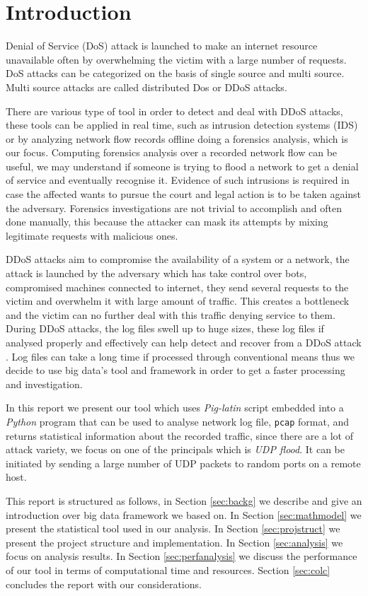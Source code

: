 \section{Introduction}
\label{sec:intro}
Denial of Service (DoS) attack is launched to make an internet resource unavailable often by overwhelming the victim with a large number of requests. DoS attacks can be categorized on the basis of single source and multi source. Multi source attacks are called distributed Dos or DDoS attacks\cite{ddos_forensics}.
 
There are various type of tool in order to detect and deal with DDoS attacks, these tools can be applied in real time, such as intrusion detection systems (IDS) or by analyzing network flow records offline doing a forensics analysis, which is our focus.
Computing forensics analysis over a recorded network flow can be useful, we may understand if someone is trying to flood a network to get a denial of service and eventually recognise it.
Evidence of such intrusions is required in case the affected wants to pursue the court and legal action is to be taken against the adversary.
Forensics investigations are not trivial to accomplish and often done manually, this because the attacker can mask its attempts by mixing legitimate requests with malicious ones.

DDoS attacks aim to compromise the availability of a system or a network, the attack is launched by the adversary which has take control over bots, compromised machines connected to internet, they send several requests to the victim and overwhelm it with large amount of traffic. This creates a bottleneck and the victim can no further deal with this traffic denying service to them.
During DDoS attacks, the log files swell up to huge sizes, these log files if analysed properly and effectively can help detect and recover from a DDoS attack \cite{ddos_forensics}. Log files can take a long time if processed through conventional means thus we decide to use big data's tool and framework in order to get a faster processing and investigation.

In this report we present our tool which uses \textit{Pig-latin} script embedded into a \textit{Python} program that can be used to analyse network log file, \texttt{pcap} format\cite{wireshrk_pcap}, and returns statistical information about the recorded traffic, since there are a lot of attack variety, we focus on one of the principals which is \textit{UDP flood}. 
It can be initiated by sending a large number of UDP packets to random ports on a remote host.

This report is structured as follows, in Section \ref{sec:backg} we describe and give an introduction over big data framework we based on. In Section \ref{sec:mathmodel} we present the statistical tool used in our analysis. In Section \ref{sec:projstruct} we present the project structure and implementation. In Section \ref{sec:analysis} we focus on analysis results. In Section \ref{sec:perfanalysis} we discuss the performance of our tool in terms of computational time and resources. Section \ref{sec:colc} concludes the report with our considerations.  